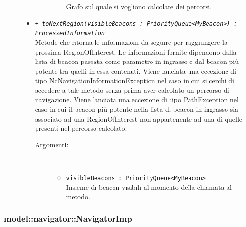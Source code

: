 \documentclass[../DefinizioneDiProdotto.tex]{subfiles}
\begin{document}
\begin{description}
\begin{itemize}
\begin{description}
\begin{itemize}
Grafo sul quale si vogliono calcolare dei percorsi.\end{itemize}
\end{description}
\item \texttt{+ \textit{toNextRegion(visibleBeacons : PriorityQueue<MyBeacon>) : ProcessedInformation}}\\
Metodo che ritorna le informazioni da seguire per raggiungere la prossima RegionOfInterest. Le informazioni fornite dipendono dalla lista di beacon passata come parametro in ingrasso e dal beacon più potente tra quelli in essa contenuti. 
Viene lanciata una eccezione di tipo NoNavigationInformationException nel caso in cui si cerchi di accedere a tale metodo senza prima aver calcolato un percorso di navigazione.
Viene lanciata una eccezione di tipo PathException nel caso in cui il beacon più potente nella lista di beacon in ingrasso sia associato ad una RegionOfInterest non appartenente ad una di quelle presenti nel percorso calcolato.
 \begin{description}
\item[Argomenti:] \
\begin{itemize}
\item \texttt{visibleBeacons : PriorityQueue<MyBeacon>}\\
Insieme di beacon visibili al momento della chiamata al metodo.\end{itemize}
\end{description}
\end{itemize}
\end{description}

\subsubsection{model::navigator::NavigatorImp}
\end{document}
